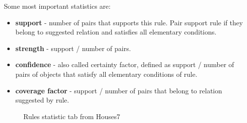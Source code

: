 Some most important statistics are:
\begin{itemize}
	\item \textbf{support} - number of pairs that supports this rule. Pair support rule if they belong to suggested relation and satisfies all elementary conditions.
	\item \textbf{strength} - support / number of pairs.
	\item \textbf{confidence} - also called certainty factor, defined as support / number of pairs of objects that satisfy all elementary conditions of rule.
	\item \textbf{coverage factor} - support / number of pairs that belong to relation suggested by rule.
\end{itemize}

\begin{figure*}[!ht] 
	\centering
	\caption{Rules statistic tab from Houses7}
\end{figure*}

\vfill\newpage